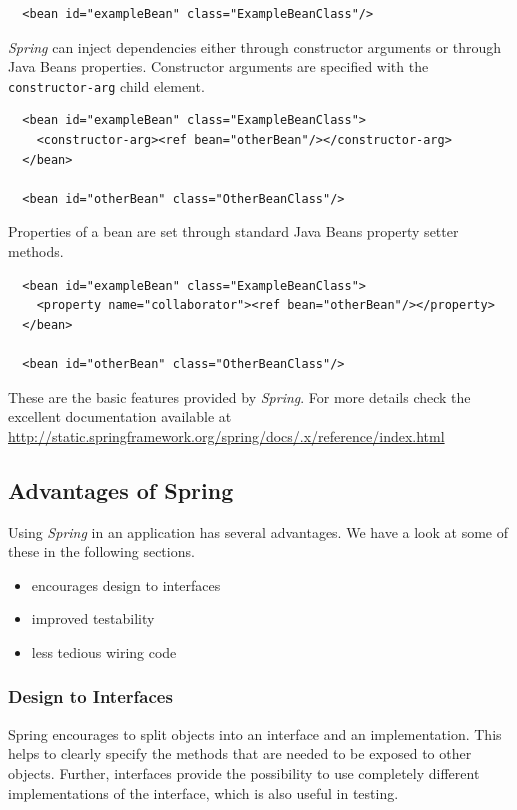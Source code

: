 \small{\begin{verbatim}
  <bean id="exampleBean" class="ExampleBeanClass"/>  
\end{verbatim}}

\emph{Spring} can inject dependencies either through
constructor arguments or through Java Beans properties. Constructor arguments
are specified with the \texttt{constructor-arg} child element.

\small{\begin{verbatim}
  <bean id="exampleBean" class="ExampleBeanClass">
    <constructor-arg><ref bean="otherBean"/></constructor-arg>
  </bean>
  
  <bean id="otherBean" class="OtherBeanClass"/>
\end{verbatim}}

Properties of a bean are set through standard Java Beans property setter
methods.

\small{\begin{verbatim}
  <bean id="exampleBean" class="ExampleBeanClass">
    <property name="collaborator"><ref bean="otherBean"/></property>
  </bean>
  
  <bean id="otherBean" class="OtherBeanClass"/>
\end{verbatim}}

These are the basic features provided by \emph{Spring}. For more
details check the excellent documentation available at  
\href{http://static.springframework.org/spring/docs/1.2.x/reference/index.html}{http://static\-.springframework\-.org/\-spring/\-docs/.x/\-reference/\-index.html}


\subsection{Advantages of Spring}

Using \emph{Spring} in an application has several advantages. We have a look
at some of these in the following sections.

\begin{itemize}
 \item encourages design to interfaces
 \item improved testability
 \item less tedious wiring code
\end{itemize}

\subsubsection{Design to Interfaces}
Spring encourages to split objects into an interface and an implementation.
This helps to clearly specify the methods that are needed to be exposed to
other objects. Further, interfaces provide the possibility to use completely
different implementations of the interface, which is also useful in testing.

